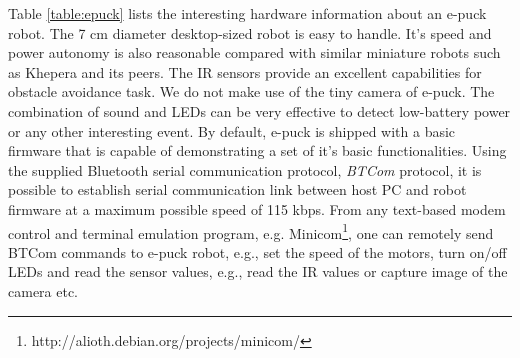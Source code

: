 Table \ref{table:epuck} lists the interesting hardware information about an e-puck robot. The 7 cm diameter desktop-sized robot is easy to handle. It's speed and power autonomy is also reasonable compared with similar miniature robots such as Khepera and its peers. The IR sensors provide an excellent capabilities for obstacle avoidance task. We do not make use of the tiny camera of e-puck. The combination of sound and LEDs can be very effective to detect low-battery power or any other interesting event. By default, e-puck is shipped with a basic firmware that is capable of demonstrating a set of it's basic functionalities. Using the supplied Bluetooth serial communication protocol,  {\em BTCom} protocol, it is possible to establish serial communication link between host PC and robot firmware at a maximum possible speed of 115 kbps. From any  text-based modem control and terminal emulation program, e.g. Minicom\footnote{http://alioth.debian.org/projects/minicom/}, one can remotely send BTCom commands to e-puck robot, e.g., set the speed of the motors, turn on/off LEDs and read the sensor values, e.g., read the IR values or capture image of the camera etc.
